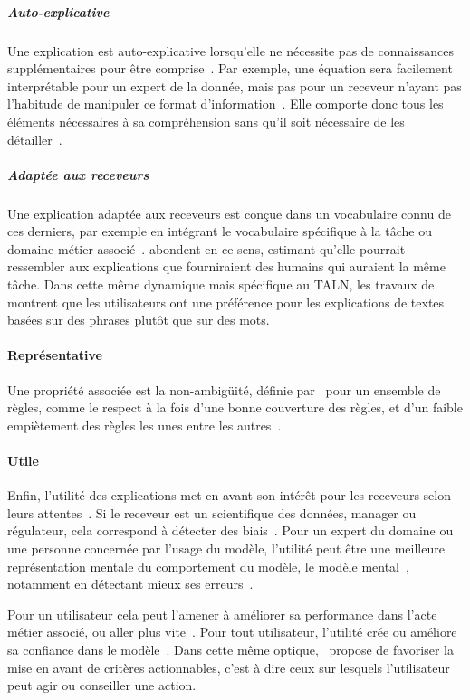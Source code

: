 \subparagraph{Auto-explicative}
Une explication est auto-explicative lorsqu'elle ne nécessite pas de connaissances supplémentaires pour être comprise~\cite{Codella2019,Gilpin2018}. Par exemple, une équation sera facilement interprétable pour un expert de la donnée, mais pas pour un receveur n'ayant pas l'habitude de manipuler ce format d'information~\cite{Ribeiro2016}. Elle comporte donc tous les éléments nécessaires à sa compréhension sans qu'il soit nécessaire de les détailler~\cite{Hoffman2018}.

\subparagraph{Adaptée aux receveurs}
Une explication adaptée aux receveurs est conçue dans un vocabulaire connu de ces derniers, par exemple en intégrant le vocabulaire spécifique à la tâche ou domaine métier associé~\cite{Codella2019}.
\cite{Dam2018, DeYoung2019} abondent en ce sens, estimant qu'elle pourrait ressembler aux explications que fourniraient des humains qui auraient la même tâche. Dans cette même dynamique mais spécifique au TALN, les travaux de~\cite{Zafar2021a} montrent que les utilisateurs ont une préférence pour les explications de textes basées sur des phrases plutôt que sur des mots.

\paragraph{Représentative}
Une propriété associée est la non-ambigüité, définie par~\cite{Lakkaraju2019} pour un ensemble de règles, comme le respect à la fois d'une bonne couverture des règles, et d'un faible empiètement des règles les unes entre les autres~\cite{Lakkaraju2019}.

\paragraph{Utile}
Enfin, l'utilité des explications met en avant son intérêt pour les receveurs selon leurs attentes~\cite{Miller2017,Hoffman2018}. Si le receveur est un scientifique des données, manager ou régulateur, cela correspond à détecter des biais~\cite{Gilpin2018}.
Pour un expert du domaine ou une personne concernée par l'usage du modèle, l'utilité peut être une meilleure représentation mentale du comportement du modèle, le modèle mental~\cite{Arrieta2020,Ribeiro2018,Dam2018,Mohseni2021a}, notamment en détectant mieux ses erreurs~\cite{DoshiVelez2017}.

Pour un utilisateur cela peut l'amener à améliorer sa performance dans l'acte métier associé, ou aller plus vite~\cite{Ribeiro2018, Dhurandhar2017,Gilpin2018,Janssen2020,Mohseni2021a}. Pour tout utilisateur, l'utilité crée ou améliore sa confiance dans le modèle~\cite{Hoffman2018,Mohseni2021a}. Dans cette même optique,~\cite{Rasouli2022} propose de favoriser la mise en avant de critères actionnables, c'est à dire ceux sur lesquels l'utilisateur peut agir ou conseiller une action.
\vspace{1cm}

